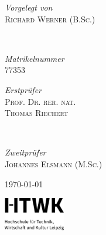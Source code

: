 \begin{titlepage}
		\vfill
		\vfill
		
		
		\begin{minipage}{0.4\textwidth}
			\begin{flushleft}
				\large
				\textit{Vorgelegt von}\\
				\textsc{Richard Werner (B.Sc.)}
			\end{flushleft}
		\end{minipage}
		~
		\begin{minipage}{0.4\textwidth}
			\begin{flushright}
				\large
				\textit{Matrikelnummer}\\
				\textsc{77353}
			\end{flushright}
		\end{minipage}
		
		
		\vfill
		
		\begin{minipage}{0.4\textwidth}
			\begin{flushleft}
				\large
				\textit{Erstprüfer}\\
				\textsc{Prof. Dr. rer. nat.\\Thomas Riechert}
			\end{flushleft}
		\end{minipage}
		~
		\begin{minipage}{0.4\textwidth}
			\begin{flushright}
				\large
				\textit{Zweitprüfer}\\
				\textsc{Johannes Elsmann (M.Sc.)}
			\end{flushright}
		\end{minipage}
		
		
		
		\vfill\vfill\vfill %
		
		{\large\today} %
		
		
		\vfill\vfill
		\includegraphics[width=0.2\textwidth]{misc/HTWK_Zusatz_de_V_Black.jpg}\\[1cm] 
		
		
		\vfill %
		
	\end{titlepage}